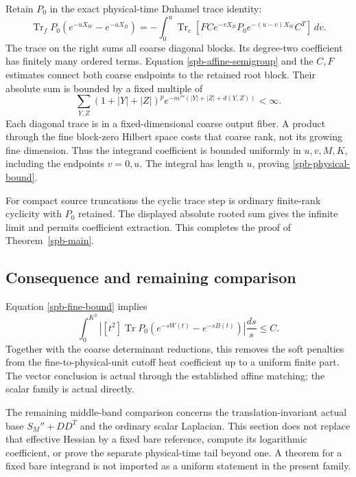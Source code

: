 Retain $P_0$ in the exact physical-time Duhamel trace identity:
\begin{equation}
 \operatorname{Tr}_fP_0(e^{-uX_W}-e^{-uX_B})
  =-\int_0^u\operatorname{Tr}_c
       [FCe^{-vX_B}P_0e^{-(u-v)X_W}C^T]\,dv.
 \label{spb-coarse-duhamel}
\end{equation}
The trace on the right sums all coarse diagonal blocks.
Its degree-two coefficient has finitely many ordered terms.
Equation \eqref{spb-affine-semigroup} and the $C,F$ estimates connect
both coarse endpoints to the retained root block. Their absolute
sum is bounded by a fixed multiple of
\[
 \sum_{Y,Z}(1+|Y|+|Z|)^p
            e^{-m'''(|Y|+|Z|+d(Y,Z))}<\infty.
\]
Each diagonal trace is in a fixed-dimensional coarse output fiber.
A product through the fine block-zero Hilbert space costs that coarse
rank, not its growing fine dimension. Thus the integrand coefficient
is bounded uniformly in $u,v,M,K$, including the endpoints $v=0,u$.
The integral has length $u$, proving \eqref{spb-physical-bound}.

For compact source truncations the cyclic trace step is ordinary
finite-rank cyclicity with $P_0$ retained. The displayed absolute
rooted sum gives the infinite limit and permits coefficient extraction.
This completes the proof of Theorem~\ref{spb-main}.

\subsection{Consequence and remaining comparison}
\label{spb-scope}

Equation \eqref{spb-fine-bound} implies
\begin{equation}
 \int_0^{K^2}\left|[t^2]\operatorname{Tr}
 P_0(e^{-sW(t)}-e^{-sB(t)})\right|\frac{ds}{s}\le C.
 \label{spb-integrated}
\end{equation}
Together with the coarse determinant reductions, this removes the
soft penalties from the fine-to-physical-unit cutoff heat coefficient
up to a uniform finite part. The vector conclusion is actual through
the established affine matching; the scalar family is actual directly.

The remaining middle-band comparison concerns the translation-invariant
actual base $S_M''+DD^T$ and the ordinary scalar Laplacian.
This section does not replace that effective Hessian by a fixed bare
reference, compute its logarithmic coefficient, or prove the separate
physical-time tail beyond one. A theorem for a fixed bare integrand
is not imported as a uniform statement in the present family.

